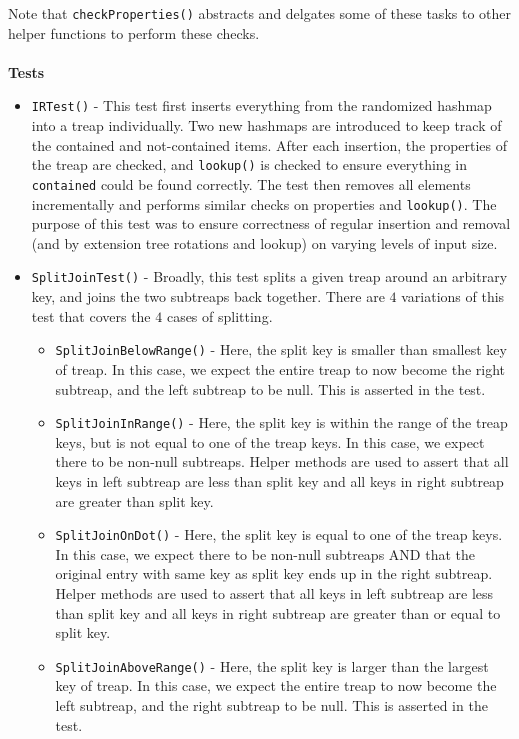 \documentclass[11pt]{article}
\def\tt{\texttt}
\def\lu{\tt{lookup()}}
\begin{document}
Note that \tt{checkProperties()} abstracts and delgates some of these tasks to other helper functions to perform these checks. \\ \\
\textbf{Tests} 
\begin{itemize}
	\item \tt{IRTest()} - This test first inserts everything from the randomized hashmap into a treap individually. Two new hashmaps are introduced to keep track of the contained and not-contained items. After each insertion, the properties of the treap are checked, and \lu{} is checked to ensure everything in \tt{contained} could be found correctly. The test then removes all elements incrementally and performs similar checks on properties and \lu. The purpose of this test was to ensure correctness of regular insertion and removal (and by extension tree rotations and lookup) on varying levels of input size. 
	\item \tt{SplitJoinTest()} - Broadly, this test splits a given treap around an arbitrary key, and joins the two subtreaps back together. There are $4$ variations of this test that covers the $4$ cases of splitting.
	\begin{itemize}
		\item \tt{SplitJoinBelowRange()} - Here, the split key is smaller than smallest key of treap. In this case, we expect the entire treap to now become the right subtreap, and the left subtreap to be null. This is asserted in the test.
		\item \tt{SplitJoinInRange()} -  Here, the split key is within the range of the treap keys, but is not equal to one of the treap keys. In this case, we expect there to be non-null subtreaps. Helper methods are used to assert that all keys in left subtreap are less than split key and all keys in right subtreap are greater than split key.
		\item \tt{SplitJoinOnDot()} -  Here, the split key is equal to one of the treap keys. In this case, we expect there to be non-null subtreaps AND that the original entry with same key as split key ends up in the right subtreap. Helper methods are used to assert that all keys in left subtreap are less than split key and all keys in right subtreap are greater than or equal to split key.
		\item \tt{SplitJoinAboveRange()} - Here, the split key is larger than the largest key of treap. In this case, we expect the entire treap to now become the left subtreap, and the right subtreap to be null. This is asserted in the test.

\end{itemize}
\end{itemize}
\end{document}
